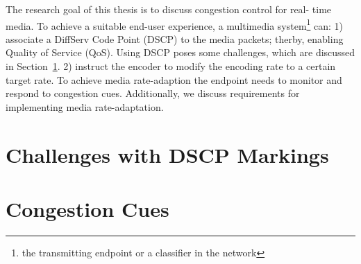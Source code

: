 
The research goal of this thesis is to discuss congestion control for real-
time media. To achieve a suitable end-user experience, a multimedia
system\footnote{the transmitting endpoint or a classifier in the network} can:
1) associate a DiffServ Code Point (DSCP) to the media packets; therby,
enabling Quality of Service (QoS). Using DSCP poses some challenges, which are
discussed in Section~\ref{rg.ch.dscp}. 2) instruct the encoder to modify the
encoding rate to a certain target rate. To achieve media rate-adaption the
endpoint needs to monitor and respond to congestion cues. Additionally, we 
discuss requirements for implementing media rate-adaptation.


\section{Challenges with DSCP Markings}
\label{rg.ch.dscp}


\section{Congestion Cues}

